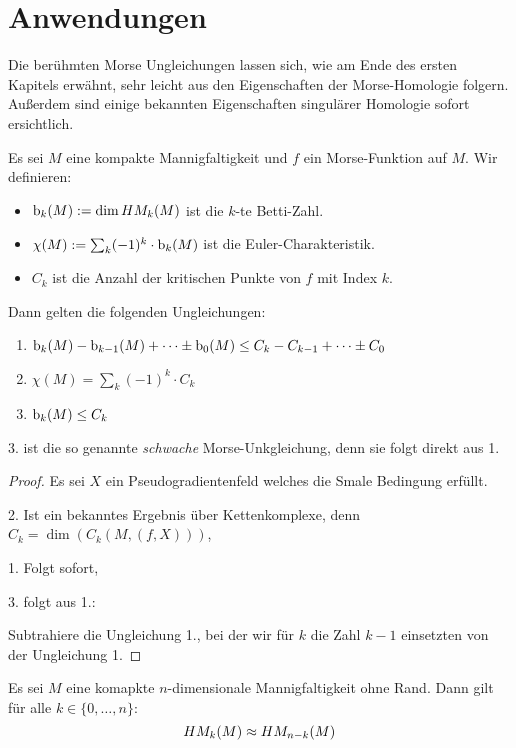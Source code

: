 \section{Anwendungen}

Die berühmten Morse Ungleichungen lassen sich, wie am Ende des ersten Kapitels erwähnt, sehr
leicht aus den Eigenschaften der Morse-Homologie folgern. Außerdem sind einige bekannten 
Eigenschaften singulärer Homologie sofort ersichtlich.

\begin{theorem}
    \label{satz: morse-ungleichungen}
    Es sei $M$ eine kompakte Mannigfaltigkeit und $f$ ein Morse-Funktion auf $M$.
    Wir definieren:
    \begin{itemize}
        \item ${ \operatorname{b} }_k (M) := \dim HM_k (M)$ ist die $k$-te Betti-Zahl.
        \item $\chi(M) := \sum_k (-1)^k \cdot { \operatorname{b} }_k(M)$ ist die Euler-Charakteristik.
        \item $C_k$ ist die Anzahl der kritischen Punkte von $f$ mit Index $k$.
    \end{itemize}
    Dann gelten die folgenden Ungleichungen:
    \begin{enumerate}
        \item ${ \operatorname{b} }_k(M) - { \operatorname{b} }_{k - 1}(M) + \dots \pm { \operatorname{b} }_0(M) \leq
            C_k - C_{k - 1} + \dots \pm C_0$
        \item $\chi (M) = \sum_k (-1)^k \cdot C_k$
        \item ${ \operatorname{b} }_k(M) \leq C_k$
    \end{enumerate}
    3. ist die so genannte \emph{schwache} Morse-Unkgleichung, denn sie folgt direkt aus 1.
\end{theorem}

\begin{proof}
    Es sei $X$ ein Pseudogradientenfeld welches die Smale Bedingung erfüllt.

    2. Ist ein bekanntes Ergebnis über Kettenkomplexe, denn $C_k = \dim(C_k (M, (f, X)))$,

    1. Folgt sofort,

    3. folgt aus 1.:

    Subtrahiere die Ungleichung 1., bei der wir für $k$ die Zahl $k - 1$ einsetzten von der 
    Ungleichung 1.
\end{proof}

\begin{theorem}
    \label{satz: poincare-dualität}
    Es sei $M$ eine komapkte $n$-dimensionale Mannigfaltigkeit ohne Rand. Dann gilt für alle 
    $k \in \{ 0, \dots, n\}$:
    \[ HM_k (M) \approx HM_{n - k} (M) \]
\end{theorem}

